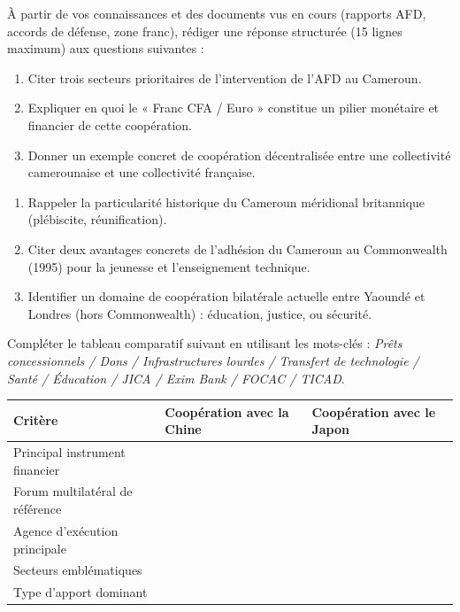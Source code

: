 \documentclass[11pt]{article}
\newcounter{popsec}
\newcounter{popsub}
\newcommand{\courssub}[1]{%
  \stepcounter{popsub}%
  \par\vspace{9pt}\noindent{\popxbold\fontsize{11.5}{13}\selectfont\color{popink}{\color{poporange}\thepopsec.\thepopsub}\hspace{6pt}#1}\par\nopagebreak\vspace{4pt}
}
\begin{document}
\courssub{Je m'entraîne}

\begin{exercice}
À partir de vos connaissances et des documents vus en cours (rapports AFD, accords de défense, zone franc), rédiger une réponse structurée (15 lignes maximum) aux questions suivantes :
\begin{enumerate}
\item Citer trois secteurs prioritaires de l'intervention de l'AFD au Cameroun.
\item Expliquer en quoi le « Franc CFA / Euro » constitue un pilier monétaire et financier de cette coopération.
\item Donner un exemple concret de coopération décentralisée entre une collectivité camerounaise et une collectivité française.
\end{enumerate}
\end{exercice}

\begin{exercice}
\begin{enumerate}
\item Rappeler la particularité historique du Cameroun méridional britannique (plébiscite, réunification).
\item Citer deux avantages concrets de l'adhésion du Cameroun au Commonwealth (1995) pour la jeunesse et l'enseignement technique.
\item Identifier un domaine de coopération bilatérale actuelle entre Yaoundé et Londres (hors Commonwealth) : éducation, justice, ou sécurité.
\end{enumerate}
\end{exercice}

\begin{exercice}
Compléter le tableau comparatif suivant en utilisant les mots-clés : \emph{Prêts concessionnels / Dons / Infrastructures lourdes / Transfert de technologie / Santé / Éducation / JICA / Exim Bank / FOCAC / TICAD}.

\begin{center}
\begin{tabularx}{\linewidth}{|l|X|X|}
\hline
\textbf{Critère} & \textbf{Coopération avec la Chine} & \textbf{Coopération avec le Japon} \\
\hline
Principal instrument financier & & \\
\hline
Forum multilatéral de référence & & \\
\hline
Agence d'exécution principale & & \\
\hline
Secteurs emblématiques & & \\
\hline
Type d'apport dominant & & \\
\hline
\end{tabularx}
\end{center}
\end{exercice}
\end{document}
